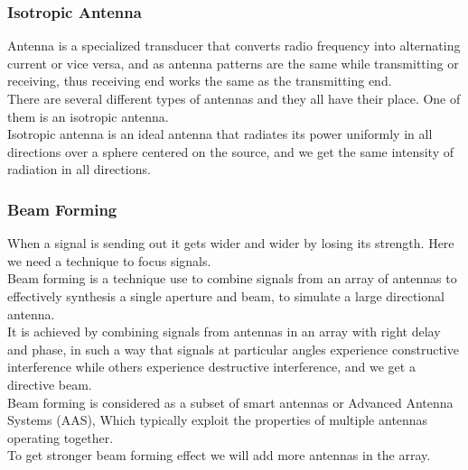 \documentclass[a4paper, twoside] {thesis}
\begin{document}
\subsubsection{Isotropic Antenna}
Antenna is a specialized transducer that converts radio frequency into alternating current or vice versa, and as antenna patterns are the same while transmitting or receiving, thus receiving end works the same as the transmitting end.\\
There are several different types of antennas and they all have their place. One of them is an isotropic antenna.\\
Isotropic antenna is an ideal antenna that radiates its power uniformly in all directions over a sphere centered on the source, and we get the same intensity of radiation in all directions.

\subsubsection{Beam Forming}
When a signal is sending out it gets wider and wider by losing its strength. Here we need a technique to focus signals.\\
Beam forming is a technique use to combine signals from an array of antennas to effectively synthesis a single aperture and beam, to simulate a large directional antenna.\\
It is achieved by combining signals from antennas in an array with right delay and phase, in such a way that signals at particular angles experience constructive interference while others experience destructive interference, and we get a directive beam.\\
Beam forming is considered as a subset of smart antennas or Advanced Antenna Systems (AAS), Which typically exploit the properties of multiple antennas operating together.\\
To get stronger beam forming effect we will add more antennas in the array.
\end{document}
